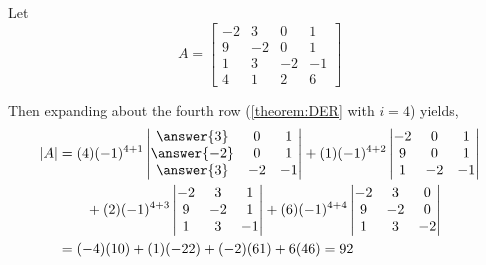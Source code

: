 \documentclass{ximera}
\begin{document}
\begin{example}
  Let
  \[
    A=
    \begin{bmatrix}
      -2 & 3 & 0 & 1\\
      9 & -2 & 0 & 1\\
      1 & 3 & -2 & -1\\
      4 & 1 & 2 & 6
    \end{bmatrix}
  \]

  Then expanding about the fourth row (\ref{theorem:DER} with $i=4$)
  yields,
  \begin{align*}
    \detbars{A}
    &=
      (4)(-1)^{4+1}
      \begin{vmatrix}
        \answer{3} & 0 & 1\\
        \answer{-2} & 0 & 1\\
        \answer{3} & -2 & -1
      \end{vmatrix}
                 +(1)(-1)^{4+2}
                 \begin{vmatrix}
                   -2 &  0 & 1\\
                   9 &  0 & 1\\
                   1 &  -2 & -1
                 \end{vmatrix}\\
    &\quad\quad+(2)(-1)^{4+3}
      \begin{vmatrix}
        -2 & 3 &  1\\
        9 & -2 &  1\\
        1 & 3  & -1
      \end{vmatrix}
                 +(6)(-1)^{4+4}
                 \begin{vmatrix}
                   -2 & 3 & 0 \\
                   9 & -2 & 0 \\
                   1 & 3 & -2
                 \end{vmatrix}\\
    &=
      (-4)(10)+(1)(-22)+(-2)(61)+6(46)=92
  \end{align*}


\end{example}
\end{document}
